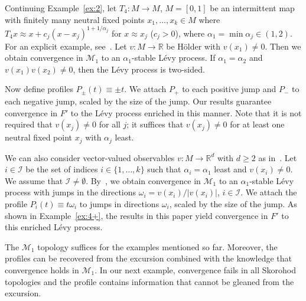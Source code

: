 \documentclass[12pt]{article}
\numberwithin{equation}{section}
\newcommand{\R}{{\mathbb R}}
\newcommand{\cI}{{\mathcal I}}
\newcommand{\cM}{{\mathcal M}}
\begin{document}
\begin{example} \label{ex:4}
Continuing Example~\ref{ex:2}, let
$T_4:M\to M$, $M=[0,1]$ be an intermittent map with finitely many neutral fixed points $x_1,\dots,x_k\in M$ where 
$T_4x\approx x+c_j (x-x_j)^{1+1/\alpha_j}$ for $x\approx x_j$ ($c_j>0$),
where $\alpha_1=\min\alpha_j\in(1,2)$.
For an explicit example, see~\cite[eq.~(1.5) and Lemma~6.3]{CFKM20}.
Let $v:M\to\R$ be H\"older with $v(x_1)\neq0$.
Then we obtain 
convergence in $\cM_1$ to an $\alpha_1$-stable L\'evy process.
If $\alpha_1=\alpha_2$ and $v(x_1)v(x_2)\neq0$, then the L\'evy process is two-sided.

Now define profiles $P_\pm(t)\equiv \pm t$. We attach $P_+$ to each positive jump and $P_-$ to each negative jump, scaled by the size of the jump.
Our results guarantee convergence in $F'$ to the L\'evy process enriched in this manner.
Note that it is not required that $v(x_j)\neq0$ for all $j$; it suffices that $v(x_j)\neq0$ for at least one neutral fixed point $x_j$ with $\alpha_j$ least.

We can also consider vector-valued observables $v:M\to\R^d$ 
with $d\ge2$ as in~\cite{CFKM20}.
Let $i\in\cI$ be the set of indices $i\in\{1,\dots,k\}$ such that
$\alpha_i=\alpha_1$ least and $v(x_i)\neq0$. 
We assume that $\cI\neq\emptyset$.
By~\cite{CFKM20}, we obtain convergence in $\cM_1$ to an $\alpha_1$-stable L\'evy process with jumps in the directions
$\omega_i=v(x_i)/|v(x_i)|$, $i\in\cI$. We attach the profile $P_i(t)\equiv t\omega_i$ to jumps in directions $\omega_i$, scaled by the size of the jump.
As shown in Example~\ref{ex:4+}, the results in this paper yield convergence in $F'$ to this enriched L\'evy process.
\end{example}

The $\cM_1$ topology suffices for the examples mentioned so far. Moreover, the profiles can be recovered from the excursion combined with the knowledge that convergence holds in $\cM_1$. In our next example, convergence fails in all Skorohod topologies and the profile contains information that cannot be gleaned from the excursion.
\end{document}
